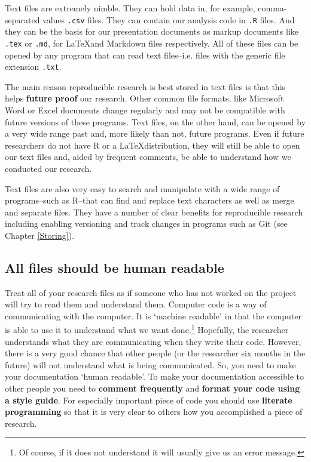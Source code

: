 \documentclass[ChapterTOCs,krantz1]{krantz}\usepackage{graphicx, color}
\begin{document}
Text files are extremely nimble. They can hold data in, for example, comma-separated values {\tt{.csv}}  files. They can contain our analysis code in {\tt{.R}} files. And they can be the basis for our presentation documents as markup documents like {\tt{.tex}} or {\tt{.md}}, for \LaTeX and Markdown files respectively. All of these files can be opened by any program that can read text files--i.e. files with the generic file extension {\tt{.txt}}. 

The main reason reproducible research is best stored in text files is that this helps {\bf{future proof}} our research. Other common file formats, like Microsoft Word  or Excel  documents change regularly and may not be compatible with future versions of these programs. Text files, on the other hand, can be opened by a very wide range past and, more likely than not, future programs. Even if future researchers do not have R or a \LaTeX distribution, they will still be able to open our text files and, aided by frequent comments, be able to understand how we conducted our research.

Text files are also very easy to search and manipulate with a wide range of programs--such as R--that can find and replace text characters as well as merge and separate files. They have a number of clear benefits for reproducible research including enabling versioning and track changes in programs such as Git (see Chapter \ref{Storing}).   

\subsection{All files should be human readable}

Treat all of your research files as if someone who has not worked on the project will try to read them and understand them. Computer code is a way of communicating with the computer. It is `machine readable' in that the computer is able to use it to understand what we want done.\footnote{Of course, if it does not understand it will usually give us an error message.} Hopefully, the researcher understands what they are communicating when they write their code. However, there is a very good chance that other people (or the researcher six months in the future) will not understand what is being communicated. So, you need to make your documentation `human readable'. To make your documentation accessible to other people you need to {\bf{comment frequently}} and {\bf{format your code using a style guide}}. For especially important piece of code you should use {\bf{literate programming}} so that it is very clear to others how you accomplished a piece of research.
\end{document}
